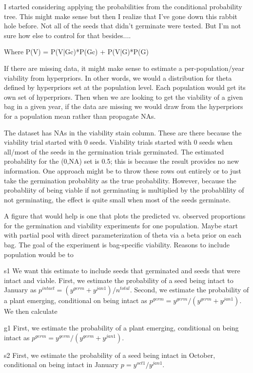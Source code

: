 \documentclass[12pt, oneside, titlepage]{article}   	%
\begin{document}
I started considering applying the probabilities from the conditional probability tree. This might make sense but then I realize that I've gone down this rabbit hole before. Not all of the seeds that didn't germinate were tested. But I'm not sure how else to control for that besides....

Where P(V) = P(V|Gc)*P(Gc) + P(V|G)*P(G)

If there are missing data, it might make sense to estimate a per-population/year viability from hyperpriors. In other words, we would a distribution for theta defined by hyperpriors set at the population level. Each population would get its own set of hyperpriors. Then when we are looking to get the viability of a given bag in a given year, if the data are missing we would draw from the hyperpriors for a population mean rather than propagate NAs. 

The dataset has NAs in the viability stain column. These are there because the viability trial started with 0 seeds. Viability trials started with 0 seeds when all/most of the seeds in the germination trials germinated. The estimated probability for the (0,NA) set is 0.5; this is because the result provides no new information. One approach might be to throw these rows out entirely or to just take the germination probablity as the true probability. However, because the probabliity of being viable if not germinating is multiplied by the probablility of not germinating, the effect is quite small when most of the seeds germinate. 

A figure that would help is one that plots the predicted vs. observed proportions for the germination and viability experiments for one population. 
 Maybe start with partial pool with direct parameterization of theta via a beta prior on each bag. The goal of the experiment is bag-specific viability. Reasons to include population would be to
 
 s1 We want this estimate to include seeds that germinated and seeds that were intact and viable. First, we estimate the probability of a seed being intact to January as $p^{intact} = (y^{germ}+y^{jan1})/n^{total}$. Second, we estimate the probability of a plant emerging, conditional on being intact as $p^{germ} = y^{germ}/(y^{germ}+y^{jan1})$. We then calculate 

g1 First, we estimate the probability of a plant emerging, conditional on being intact as $p^{germ} = y^{germ}/(y^{germ}+y^{jan1})$. 

s2 First, we estimate the probability of a seed being intact in October, conditional on being intact in January $ p = y^{oct1} / y^{jan1} $.
\end{document}
